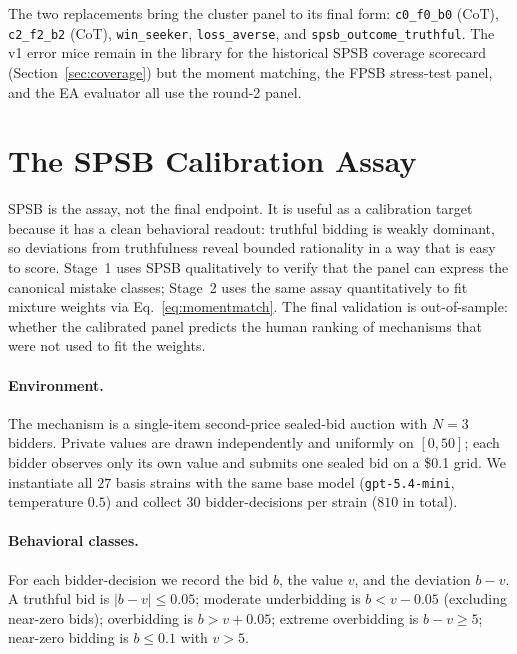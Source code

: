\documentclass[12pt]{article}
\newcommand{\SPSB}{SPSB}
\begin{document}
The two replacements bring the cluster panel to its final
form: \texttt{c0\_f0\_b0} (CoT), \texttt{c2\_f2\_b2} (CoT),
\texttt{win\_seeker}, \texttt{loss\_averse}, and
\texttt{spsb\_outcome\_truthful}. The v1 error mice remain in the
library for the historical \SPSB{} coverage scorecard
(Section~\ref{sec:coverage}) but the moment matching, the FPSB
stress-test panel, and the EA evaluator all use the round-2 panel.

\section{The \SPSB{} Calibration Assay}
\label{sec:assay}

\SPSB{} is the assay, not the final endpoint. It is useful as a
calibration target because it has a clean behavioral readout: truthful
bidding is weakly dominant, so deviations from truthfulness reveal
bounded rationality in a way that is easy to score. Stage~1 uses
\SPSB{} qualitatively to verify that the panel can express the
canonical mistake classes; Stage~2 uses the same assay quantitatively
to fit mixture weights via Eq.~\eqref{eq:momentmatch}. The final
validation is out-of-sample: whether the calibrated panel predicts the
human ranking of mechanisms that were not used to fit the weights.

\paragraph{Environment.} The mechanism is a single-item second-price
sealed-bid auction with $N=3$ bidders. Private values are drawn
independently and uniformly on $[0,50]$; each bidder observes only its
own value and submits one sealed bid on a \$0.1 grid. We instantiate
all $27$ basis strains with the same base model
(\texttt{gpt-5.4-mini}, temperature $0.5$) and collect $30$
bidder-decisions per strain ($810$ in total).

\paragraph{Behavioral classes.} For each bidder-decision we record the
bid $b$, the value $v$, and the deviation $b-v$. A truthful bid is
$|b-v|\le 0.05$; moderate underbidding is $b < v-0.05$ (excluding
near-zero bids); overbidding is $b > v + 0.05$; extreme overbidding is
$b - v \ge 5$; near-zero bidding is $b \le 0.1$ with $v > 5$.
\end{document}
